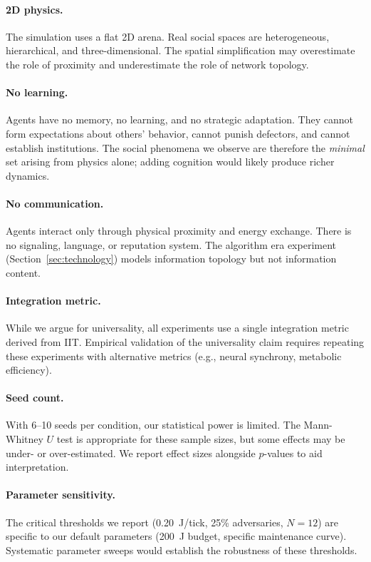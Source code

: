 \documentclass[12pt,a4paper]{article}
\begin{document}
\paragraph{2D physics.} The simulation uses a flat 2D arena. Real social spaces are heterogeneous, hierarchical, and three-dimensional. The spatial simplification may overestimate the role of proximity and underestimate the role of network topology.

\paragraph{No learning.} Agents have no memory, no learning, and no strategic adaptation. They cannot form expectations about others' behavior, cannot punish defectors, and cannot establish institutions. The social phenomena we observe are therefore the \emph{minimal} set arising from physics alone; adding cognition would likely produce richer dynamics.

\paragraph{No communication.} Agents interact only through physical proximity and energy exchange. There is no signaling, language, or reputation system. The algorithm era experiment (Section~\ref{sec:technology}) models information topology but not information content.

\paragraph{Integration metric.} While we argue for universality, all experiments use a single integration metric derived from IIT. Empirical validation of the universality claim requires repeating these experiments with alternative metrics (e.g., neural synchrony, metabolic efficiency).

\paragraph{Seed count.} With 6--10 seeds per condition, our statistical power is limited. The Mann-Whitney $U$ test is appropriate for these sample sizes, but some effects may be under- or over-estimated. We report effect sizes alongside $p$-values to aid interpretation.

\paragraph{Parameter sensitivity.} The critical thresholds we report (0.20~J/tick, 25\% adversaries, $N = 12$) are specific to our default parameters (200~J budget, specific maintenance curve). Systematic parameter sweeps would establish the robustness of these thresholds.
\end{document}

